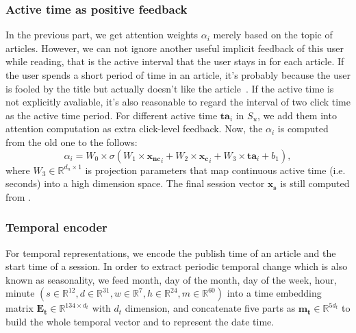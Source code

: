 \subsubsection{Active time as positive feedback}
In the previous part, we get attention weights $\alpha_i$ merely based on the topic of articles. However, we can not ignore another useful implicit feedback of this user while reading, that is the active interval that the user stays in for each article. If the user spends a short period of time in an article, it's probably because the user is fooled by the title but actually doesn't like the article~\cite{lu_quality_2019}. If the active time is not explicitly avaliable, it's also reasonable to regard the interval of two click time as the active time period. For different active time $\mathbf{ta}_i$ in $S_u$, we add them into attention computation as extra click-level feedback. Now, the $\alpha_i$ is computed from the old one to the follows:
\begin{equation}
    \alpha_i = W_0 \times \sigma (W_1 \times \mathbf{x_{nc}}_i + W_2 \times \mathbf{x_c}_i + W_3 \times \mathbf{ta}_i + b_1),
\end{equation}
where $W_3 \in \mathbb{R}^{d_n \times 1}$ is projection parameters that map continuous active time (i.e. seconds) into a high dimension space. The final session vector $\mathbf{x_s}$ is still computed from .

\subsubsection{Temporal encoder}
For temporal representations, we encode the publish time of an article and the start time of a session. In order to extract periodic temporal change which is also known as seasonality, we feed month, day of the month, day of the week, hour, minute $(s\in \mathbb{R}^{12}, d \in \mathbb{R}^{31}, w \in \mathbb{R}^7, h\in \mathbb{R}^{24}, m\in \mathbb{R}^{60})$ into a time embedding matrix $\mathbf{E_t}\in \mathbb{R}^{134 \times d_t}$ with $d_t$ dimension, and concatenate five parts as $\mathbf{m_t} \in \mathbb{R}^{5d_t}$ to build the  whole temporal vector and to represent the date time.
